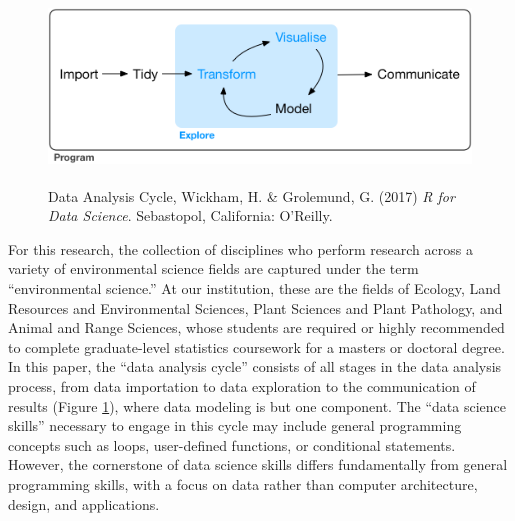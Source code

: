 \documentclass[12pt]{article}
\begin{document}
\begin{figure}[h!]
    \centering
    \includegraphics[width = \textwidth, height = 2in]{images/data-science-explore.png}
    \caption{Data Analysis Cycle, Wickham, H. \& Grolemund, G. (2017) \emph{R 
    for Data Science}. Sebastopol, California: O'Reilly.}
\label{fig:cycle}
\end{figure}

\quad For this research, the collection of disciplines who perform research 
across a variety of environmental science fields are captured under the term 
``environmental science.'' At our institution, these are the fields of Ecology, 
Land Resources and Environmental Sciences, Plant Sciences and Plant Pathology,
and Animal and Range Sciences, whose students are required or highly recommended
to complete graduate-level statistics coursework for a masters or doctoral
degree. In this paper, the ``data analysis cycle'' consists of all stages in the
data analysis process, from data importation to data exploration to the
communication of results (Figure \ref{fig:cycle}), where data modeling is but
one component. The ``data science skills'' necessary to engage in this cycle may
include general programming concepts such as loops, user-defined functions, or 
conditional statements. However, the cornerstone of data science skills differs
fundamentally from general programming skills, with a focus on data rather than 
computer architecture, design, and applications. 
\end{document}
